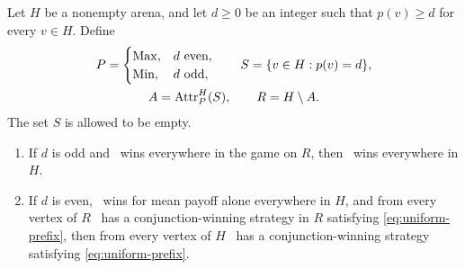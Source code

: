 \begin{lemma}
\label{lem:combine}
Let $H$ be a nonempty arena, and let $d\geq0$ be an integer such that
$p(v)\geq d$ for every $v\in H$.  Define
\begin{gather*}
 P=\begin{cases}\mathrm{Max},&d\text{ even},\\\mathrm{Min},&d\text{ odd},\end{cases}
 \qquad
 S=\{v\in H:p(v)=d\},\\
 A=\operatorname{Attr}_P^H(S),\qquad R=H\setminus A.
\end{gather*}
The set $S$ is allowed to be empty.
\begin{enumerate}
\item If $d$ is odd and \Min\ wins everywhere in the game on $R$, then
\Min\ wins everywhere in $H$.
\item If $d$ is even, \Max\ wins for mean payoff alone everywhere in $H$,
and from every vertex of $R$ \Max\ has a conjunction-winning strategy in
$R$ satisfying \eqref{eq:uniform-prefix}, then from every vertex of $H$
\Max\ has a conjunction-winning strategy satisfying
\eqref{eq:uniform-prefix}.
\end{enumerate}
\end{lemma}

